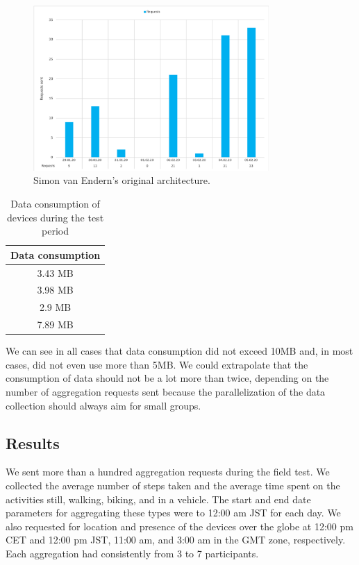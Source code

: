 \begin{figure}[htbp]
  \centering
  \includegraphics[width=0.8\textwidth]{figures/diagram_requests.png}
  \caption{Simon van Endern's original architecture.} \label{fig:diagram_requests}
\end{figure}

\begin{table}[htbp]
    \centering
    \begin{tabular}{|c|} 
        \hline
        \textbf{Data consumption}\\ [0.5ex] 
        \hline
        3.43 MB \\
        \hline
        3.98 MB \\
        \hline
        2.9 MB \\
        \hline
        7.89 MB \\
        \hline
    \end{tabular}
    \caption{Data consumption of devices during the test period }
    \label{tab:data}
\end{table}

We can see in all cases that data consumption did not exceed 10MB and, in most cases, did not even use more than 5MB. We could extrapolate that the consumption of data should not be a lot more than twice, depending on the number of aggregation requests sent because the parallelization of the data collection should always aim for small groups.

\subsection{Results}
We sent more than a hundred aggregation requests during the field test. We collected the average number of steps taken and the average time spent on the activities still, walking, biking, and in a vehicle. The start and end date parameters for aggregating these types were to 12:00 am JST for each day. We also requested for location and presence of the devices over the globe at 12:00 pm CET and 12:00 pm JST, 11:00 am, and 3:00 am in the GMT zone, respectively. Each aggregation had consistently from 3 to 7 participants.

